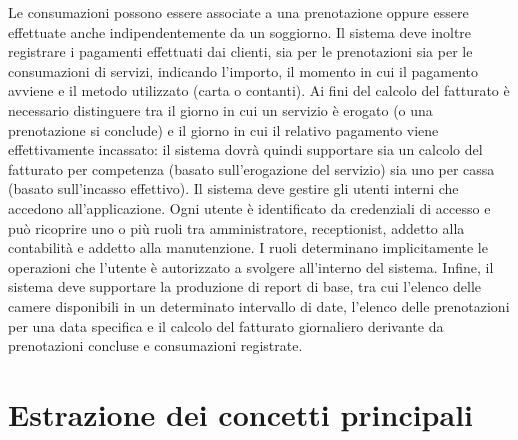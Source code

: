 \documentclass[a4paper,12pt]{report}
\begin{document}
Le consumazioni possono essere associate a una prenotazione oppure essere effettuate anche indipendentemente da un soggiorno.
\medskip
\newline
Il sistema deve inoltre registrare i pagamenti effettuati dai clienti,
sia per le prenotazioni sia per le consumazioni di servizi, indicando
l'importo, il momento in cui il pagamento avviene e il metodo
utilizzato (carta o contanti). Ai fini del calcolo del fatturato è
necessario distinguere tra il giorno in cui un servizio è erogato (o
una prenotazione si conclude) e il giorno in cui il relativo pagamento
viene effettivamente incassato: il sistema dovrà quindi supportare sia
un calcolo del fatturato per competenza (basato sull'erogazione del
servizio) sia uno per cassa (basato sull'incasso effettivo).
\medskip
\newline
Il sistema deve gestire gli utenti interni che accedono all’applicazione.
Ogni utente è identificato da credenziali di accesso e può ricoprire uno o più ruoli tra amministratore, receptionist, addetto alla contabilità e addetto alla manutenzione.
I ruoli determinano implicitamente le operazioni che l’utente è autorizzato a svolgere all’interno del sistema.
\medskip
\newline
Infine, il sistema deve supportare la produzione di report di base, tra cui l’elenco delle camere disponibili in un determinato intervallo di date, l’elenco delle prenotazioni per una data specifica e il calcolo del fatturato giornaliero derivante da prenotazioni concluse e consumazioni registrate.

\newpage
\section{Estrazione dei concetti principali}
\end{document}
